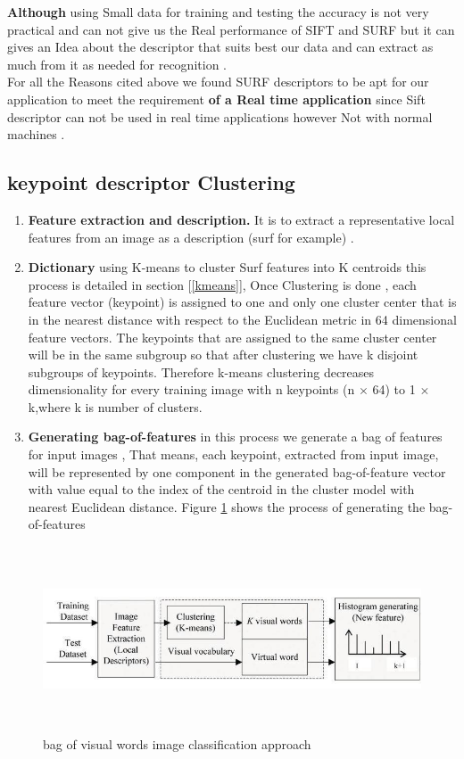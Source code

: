 \textbf{Although} using Small data for training and testing the accuracy is not very practical and can not give us the Real performance of SIFT and SURF but it can gives an Idea about the descriptor that suits best our data and can extract as much from it as needed for recognition .\\ For all the Reasons cited above  we found SURF descriptors to be apt for our application to meet the requirement  \textbf{of a  Real time application} since Sift descriptor can not be used in real time applications however Not with normal machines .


\subsection{keypoint descriptor Clustering }

\begin{enumerate}
    \item \textbf{Feature extraction and description.} It is to extract a representative local features from an image as a description (surf for example) .
    \item \textbf{ Dictionary}
using K-means to cluster Surf features into K centroids this process is detailed in section [\ref{kmeans}],  Once Clustering is done , each feature vector (keypoint) is assigned to one and only one cluster center that is in the
nearest distance with respect to the Euclidean metric in 64
dimensional feature vectors. The keypoints that are assigned to
the same cluster center will be in the same subgroup so that
after clustering we have k disjoint subgroups of keypoints.
Therefore k-means clustering decreases dimensionality for
every training image with n keypoints (n $\times$ 64) to 1 $\times$ k,where k is number of clusters.

\item \textbf{ Generating bag-of-features} in this process we generate a bag of features for input images  , That means, each keypoint, extracted from input  image, will be represented by one component in the generated
bag-of-feature vector with value equal to the index of the
centroid in the cluster model with nearest Euclidean
distance. Figure \ref{fig:bag} shows the process of generating the
bag-of-features 

\end{enumerate}

\begin{figure}[H]
\centering
\includegraphics[width=17cm, height=5.5cm]{img/BAG.jpg}
\caption{ bag of visual words image classification approach  }
\label{fig:bag}
\end{figure}


